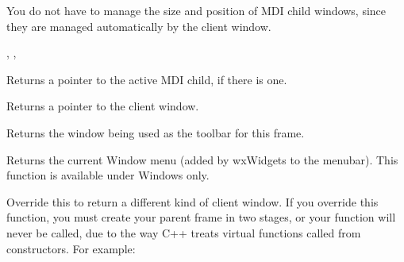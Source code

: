 You do not have to manage the size and position of MDI child windows, since they are managed
automatically by the client window.


,\rtfsp
{},\rtfsp
{}



\label{wxmdiparentframegetactivechild}


Returns a pointer to the active MDI child, if there is one.

\label{wxmdiparentframegetclientwindow}


Returns a pointer to the client window.



\label{wxmdiparentframegettoolbar}


Returns the window being used as the toolbar for this frame.



\label{wxmdiparentframegetwindowmenu}


Returns the current Window menu (added by wxWidgets to the menubar). This function
is available under Windows only.

\label{wxmdiparentframeoncreateclient}


Override this to return a different kind of client window. If you override this function,
you must create your parent frame in two stages, or your function will never be called,
due to the way C++ treats virtual functions called from constructors. For example:

